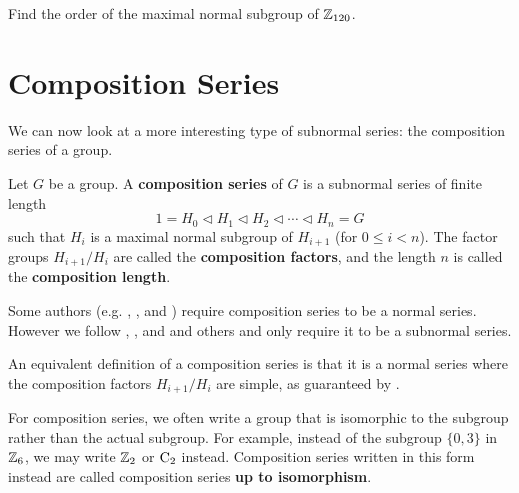 \begin{exercise}
    Find the order of the maximal normal subgroup of $\mathbb{Z}_{120}$.
\end{exercise}

\section{Composition Series}
We can now look at a more interesting type of subnormal series: the composition series of a group.

\begin{definition}
    Let $G$ be a group. A \textbf{composition series} of $G$ is a subnormal series of finite length
    \[
        1 = H_0 \lhd H_1 \lhd H_2 \lhd \cdots \lhd H_n = G
    \]
    such that $H_i$ is a maximal normal subgroup of $H_{i+1}$ (for $0 \leq i < n$). The factor groups $H_{i+1}/H_i$ are called the \textbf{composition factors}, and the length $n$ is called the \textbf{composition length}.
\end{definition}
\begin{remark}
    Some authors (e.g. {\cite[p.~257]{cohn_1982}}, \cite{proofwiki_composition-series-definition}, and {\cite[\S 73]{clark_1984}}) require composition series to be a normal series. However we follow {\cite[Definition II.8.3]{hungerford_1980}}, {\cite[Definition 15.12]{humphreys_1996}}, and {\cite[p.~85]{milne_2021}} and others and only require it to be a subnormal series.
\end{remark}
\begin{remark}
    An equivalent definition of a composition series is that it is a normal series where the composition factors $H_{i+1}/H_i$ are simple, as guaranteed by .
\end{remark}

For composition series, we often write a group that is isomorphic to the subgroup rather than the actual subgroup. For example, instead of the subgroup $\{0, 3\}$ in $\mathbb{Z}_6$, we may write $\mathbb{Z}_2$ or $\mathrm{C}_{2}$ instead. Composition series written in this form instead are called composition series \textbf{up to isomorphism}.

